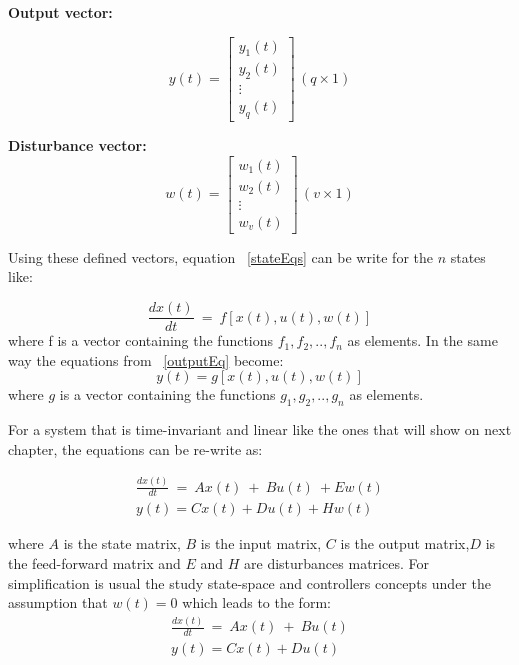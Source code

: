  \textbf{ Output vector:}
 
   \begin{equation}
y(t)=
 \left[
 \begin{matrix}
 y_1(t)\\
 y_2(t)\\
 \vdots\\
 y_q(t)
 \end{matrix}
 \right] \, (q\times 1)
 \end{equation}
 
\textbf{ Disturbance vector:}
    \begin{equation}
 w(t)=
 \left[
 \begin{matrix}
 w_1(t)\\
 w_2(t)\\
 \vdots\\
 w_v(t)
 \end{matrix}
 \right] \, (v\times 1)
 \end{equation}
 
 Using these defined vectors, equation ~\ref{stateEqs} can be write for the $n$ states like:\smallskip
 
 \begin{equation}
 	\frac{dx(t)}{dt}~=~ f[x(t),u(t),w(t)]
 \end{equation} 
 where f is a vector containing the functions $f_1,f_2,..,f_n$ as elements. In the same way the equations from ~\ref{outputEq} become:
 \begin{equation}
 	y(t)=g[x(t),u(t),w(t)]
 \end{equation}
 where $g$ is a vector containing the functions $g_1,g_2,..,g_n$ as elements.
 
 For a system that is time-invariant and linear like the ones that will show on next chapter, the equations can be re-write as:
 
 \begin{align}
	\frac{dx(t)}{dt}~=~ Ax(t)~+~Bu(t)~+Ew(t) \\
	y(t)=Cx(t)+Du(t)+Hw(t)
 \end{align}

  where $A$ is the state matrix, $B$ is the input matrix, $C$ is the output matrix,$D$ is the feed-forward matrix and  $E$ and $H$ are disturbances matrices. For simplification is usual the study state-space and controllers concepts under the assumption that $w(t) =0$ which leads to the form:
 \smallskip
 \begin{align}
 	 \frac{dx(t)}{dt}~=~ Ax(t)~+~Bu(t)\\
 	  y(t)=Cx(t)+Du(t)
 	  \label{SS_eqs}
 \end{align}

